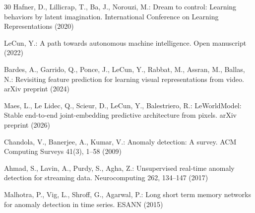 \documentclass[runningheads]{llncs}
\begin{document}
\begin{thebibliography}{30}
Hafner, D., Lillicrap, T., Ba, J., Norouzi, M.: Dream to control: Learning
behaviors by latent imagination. International Conference on Learning
Representations (2020)

LeCun, Y.: A path towards autonomous machine intelligence. Open manuscript
(2022)

Bardes, A., Garrido, Q., Ponce, J., LeCun, Y., Rabbat, M., Assran, M.,
Ballas, N.: Revisiting feature prediction for learning visual representations
from video. arXiv preprint (2024)

Maes, L., Le Lidec, Q., Scieur, D., LeCun, Y., Balestriero, R.:
LeWorldModel: Stable end-to-end joint-embedding predictive architecture from
pixels. arXiv preprint (2026)

Chandola, V., Banerjee, A., Kumar, V.: Anomaly detection: A survey. ACM
Computing Surveys 41(3), 1--58 (2009)

Ahmad, S., Lavin, A., Purdy, S., Agha, Z.: Unsupervised real-time anomaly
detection for streaming data. Neurocomputing 262, 134--147 (2017)

Malhotra, P., Vig, L., Shroff, G., Agarwal, P.: Long short term memory
networks for anomaly detection in time series. ESANN (2015)

\end{thebibliography}
\end{document}
